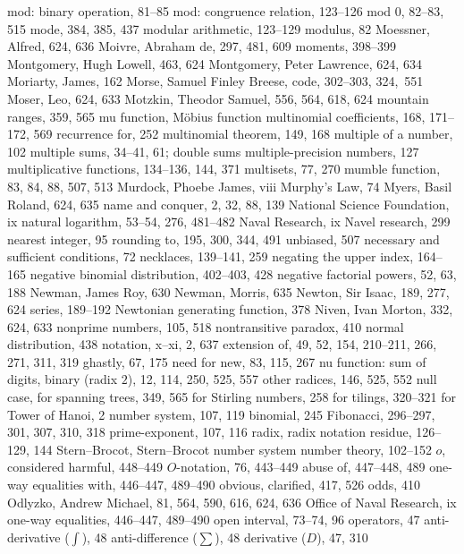 mod: binary operation, 81--85
mod: congruence relation, 123--126
mod $0$, 82--83, 515
mode, 384, 385, 437
modular arithmetic, 123--129
modulus, 82
Moessner, Alfred, 624, 636
Moivre, Abraham de, 297, 481, 609
moments, 398--399
Montgomery, Hugh Lowell, 463, 624
Montgomery, Peter Lawrence, 624, 634
Moriarty, James, 162
Morse, Samuel Finley Breese, code, 302--303, 324,~551
Moser, Leo, 624, 633
Motzkin, Theodor Samuel, 556, 564, 618, 624
mountain ranges, 359, 565
mu function, \see M\"obius function
multinomial coefficients, 168, 171--172, 569
\sub recurrence for, 252
multinomial theorem, 149, 168
multiple of a number, 102
multiple sums, 34--41, 61; \also double sums
multiple-precision numbers, 127
multiplicative functions, 134--136, 144, 371
multisets, 77, 270
mumble function, 83, 84, 88, 507, 513
Murdock, Phoebe James, viii
Murphy's Law, 74
Myers, Basil Roland, 624, 635
\medskip
name and conquer, 2, 32, 88, 139
National Science Foundation, ix
natural logarithm, 53--54, 276, 481--482
Naval Research, ix
Navel research, 299
nearest integer, 95
\sub rounding to, 195, 300, 344, 491
\sub unbiased, 507
necessary and sufficient conditions, 72
necklaces, 139--141, 259
negating the upper index, 164--165
negative binomial distribution, 402--403, 428
negative factorial powers, 52, 63, 188
Newman, James Roy, 630
Newman, Morris, 635
Newton, Sir Isaac, 189, 277, 624
\sub series, 189--192
Newtonian generating function, 378
Niven, Ivan Morton, 332, 624, 633
nonprime numbers, 105, 518
nontransitive paradox, 410
normal distribution, 438
notation, x--xi, 2, 637
\sub extension of, 49, 52, 154, 210--211, 266, 271, 311, 319
\sub ghastly, 67, 175
\sub need for new, 83, 115, 267
nu function: sum of digits,
\sub binary (radix $2$), 12, 114, 250, 525, 557
\sub other radices, 146, 525, 552
null case,
\sub for spanning trees, 349, 565
\sub for Stirling numbers, 258
\sub for tilings, 320--321
\sub for Tower of Hanoi, 2
number system, 107, 119
\sub binomial, 245
\sub Fibonacci, 296--297, 301, 307, 310, 318
\sub prime-exponent, 107, 116
\sub radix, \see radix notation
\sub residue, 126--129, 144
\sub Stern--Brocot, \see Stern--Brocot number system
number theory, 102--152
\medskip
$o$, considered harmful, 448--449
$O$-notation, 76, 443--449
\sub abuse of, 447--448, 489
\sub one-way equalities with, 446--447, 489--490
obvious, clarified, 417, 526
odds, 410
Odlyzko, Andrew Michael, 81, 564, 590, 616, 624, 636
Office of Naval Research, ix
one-way equalities, 446--447, 489--490
open interval, 73--74, 96
operators, 47
\sub anti-derivative ($\int$), 48
\sub anti-difference ($\sum$), 48
\sub derivative ($D$), 47, 310
